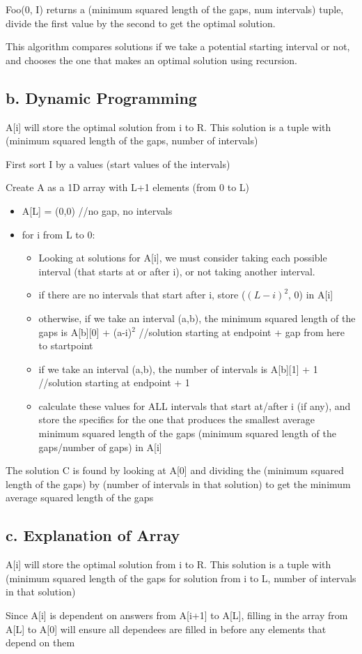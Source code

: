 \documentclass[a4paper]{article}
\begin{document}
Foo(0, I) returns a (minimum squared length of the gaps, num intervals) tuple, divide the first value by the second to get the optimal solution.

This algorithm compares solutions if we take a potential starting interval or not, and chooses the one that makes an optimal solution using recursion.

\subsection{b. Dynamic Programming}
A[i] will store the optimal solution from i to R. This solution is a tuple with (minimum squared length of the gaps, number of intervals) 

First sort I by a values (start values of the intervals)

Create A as a 1D array with L+1 elements (from 0 to L)

\begin{itemize}
    \item A[L] = (0,0) //no gap, no intervals
    \item for i from L to 0:
    \begin{itemize}
        \item Looking at solutions for A[i], we must consider taking each possible interval (that starts at or after i), or not taking another interval.
        \item if there are no intervals that start after i, store ($(L-i)^2$, 0) in A[i]
        \item otherwise, if we take an interval (a,b), the minimum squared length of the gaps is A[b][0] + (a-i)$^2$  //solution starting at endpoint + gap from here to startpoint
        \item if we take an interval (a,b), the number of intervals is A[b][1] + 1 //solution starting at endpoint + 1
        \item calculate these values for ALL intervals that start at/after i (if any), and store the specifics for the one that produces the smallest average minimum squared length of the gaps (minimum squared length of the gaps/number of gaps) in A[i]
    \end{itemize}
\end{itemize}

The solution C is found by looking at A[0] and dividing the (minimum squared length of the gaps) by (number of intervals in that solution) to get the minimum average squared length of the gaps

\subsection{c. Explanation of Array}
A[i] will store the optimal solution from i to R. This solution is a tuple with (minimum squared length of the gaps for solution from i to L, number of intervals in that solution) 

Since A[i] is dependent on answers from A[i+1] to A[L], filling in the array from A[L] to A[0] will ensure all dependees are filled in before any elements that depend on them
\end{document}
